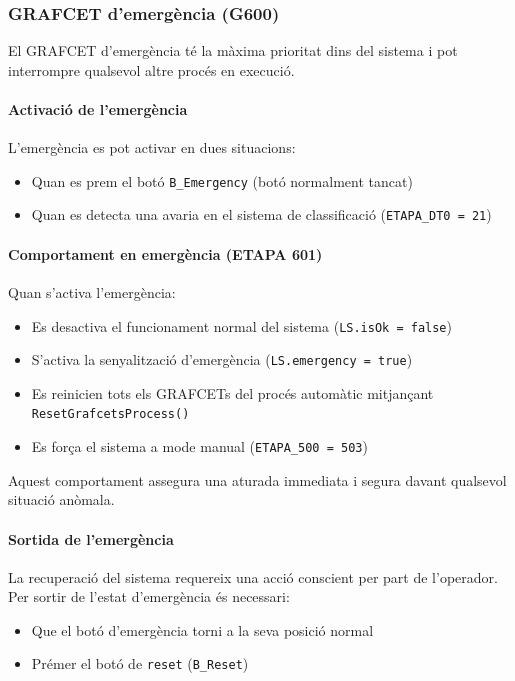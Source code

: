 \documentclass[12pt,a4paper]{report}
\begin{document}
\subsubsection{GRAFCET d'emergència (G600)}

El GRAFCET d'emergència té la màxima prioritat dins del sistema i pot interrompre qualsevol altre procés en execució.

\paragraph{Activació de l'emergència}

L'emergència es pot activar en dues situacions:
\begin{itemize}
\item Quan es prem el botó \texttt{B\_Emergency} (botó normalment tancat)
\item Quan es detecta una avaria en el sistema de classificació (\texttt{ETAPA\_DT0 = 21})
\end{itemize}

\paragraph{Comportament en emergència (ETAPA 601)}

Quan s'activa l'emergència:
\begin{itemize}
\item Es desactiva el funcionament normal del sistema (\texttt{LS.isOk = false})
\item S'activa la senyalització d'emergència (\texttt{LS.emergency = true})
\item Es reinicien tots els GRAFCETs del procés automàtic mitjançant \texttt{ResetGrafcetsProcess()}
\item Es força el sistema a mode manual (\texttt{ETAPA\_500 = 503})
\end{itemize}

Aquest comportament assegura una aturada immediata i segura davant qualsevol situació anòmala.

\paragraph{Sortida de l'emergència}

La recuperació del sistema requereix una acció conscient per part de l'operador. Per sortir de l'estat d'emergència és necessari:

\begin{itemize}
\item Que el botó d'emergència torni a la seva posició normal
\item Prémer el botó de \texttt{reset} (\texttt{B\_Reset})
\end{itemize}
\end{document}
